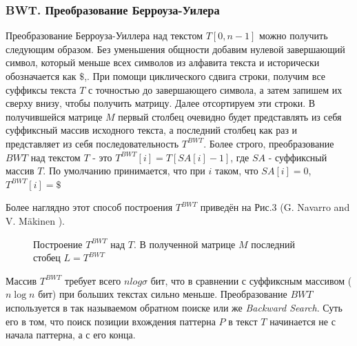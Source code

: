 \documentclass[a4paper,12pt]{article}
\begin{document}
\subsubsection{BWT. Преобразование Берроуза-Уилера}
Преобразование Берроуза-Уиллера над текстом $T[0, n-1]$ можно получить следующим образом. Без уменьшения общности добавим нулевой завершающий символ, который меньше всех символов из алфавита текста и исторически обозначается как $\$$,. При помощи циклического сдвига строки, получим все суффиксы текста $T$ с точностью до завершающего символа, а затем запишем их сверху внизу, чтобы получить матрицу. Далее отсортируем эти строки. В получившейся матрице $M$ первый столбец очевидно будет представлять из себя суффиксный массив исходного текста, а последний столбец как раз и представляет из себя последовательность $T^{BWT}$. Более строго, преобразование $BWT$ над текстом $T$ - это $T^{BWT}[i]=T[SA[i] - 1]$, где $SA$ - суффиксный массив $T$. По умолчанию принимается, что при $i$ таком, что $SA[i] = 0$, $T^{BWT}[i]=\$$

Более наглядно этот способ построения $T^{BWT}$ приведён на Рис.3 (G. Navarro and V. Mäkinen \cite{navarro2007compressed}).

\begin{figure}[h!]
\caption{Построение $T^{BWT}$ над $T$. В полученной матрице $M$ последний стобец $L = T^{BWT}$}
\end{figure}

Массив $T^{BWT}$ требует всего $nlog\sigma$ бит, что в сравнении с суффиксным массивом ($n\log{n}$ бит) при больших текстах сильно меньше. Преобразование $BWT$ используется в так называемом обратном поиске или же \textit{Backward Search}. Суть его в том, что поиск позиции вхождения паттерна $P$ в текст $T$ начинается не с начала паттерна, а с его конца.
\end{document}

